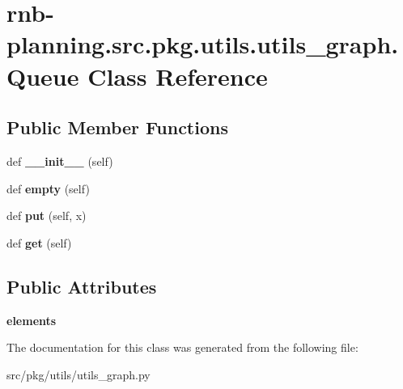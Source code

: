 \hypertarget{classrnb-planning_1_1src_1_1pkg_1_1utils_1_1utils__graph_1_1_queue}{}\section{rnb-\/planning.src.\+pkg.\+utils.\+utils\+\_\+graph.\+Queue Class Reference}
\label{classrnb-planning_1_1src_1_1pkg_1_1utils_1_1utils__graph_1_1_queue}
\subsection*{Public Member Functions}
\begin{DoxyCompactItemize}
\item 
\mbox{\label{classrnb-planning_1_1src_1_1pkg_1_1utils_1_1utils__graph_1_1_queue_aa6cf2ff4c7ee7a044a7b75a6e1cdb9d8}} 
def {\bfseries \+\_\+\+\_\+init\+\_\+\+\_\+} (self)
\item 
\mbox{\label{classrnb-planning_1_1src_1_1pkg_1_1utils_1_1utils__graph_1_1_queue_a831ef3a3098ff4a77c2784f063411c2c}} 
def {\bfseries empty} (self)
\item 
\mbox{\label{classrnb-planning_1_1src_1_1pkg_1_1utils_1_1utils__graph_1_1_queue_ae9b0e19299010de5ff4a4c825e14bbb0}} 
def {\bfseries put} (self, x)
\item 
\mbox{\label{classrnb-planning_1_1src_1_1pkg_1_1utils_1_1utils__graph_1_1_queue_a2e13abe7b7bff7f1ad9a0b5d9098176a}} 
def {\bfseries get} (self)
\end{DoxyCompactItemize}
\subsection*{Public Attributes}
\begin{DoxyCompactItemize}
\item 
\mbox{\label{classrnb-planning_1_1src_1_1pkg_1_1utils_1_1utils__graph_1_1_queue_a40958a5027a496ee648dc68e16b7c772}} 
{\bfseries elements}
\end{DoxyCompactItemize}


The documentation for this class was generated from the following file\+:\begin{DoxyCompactItemize}
\item 
src/pkg/utils/utils\+\_\+graph.\+py\end{DoxyCompactItemize}

